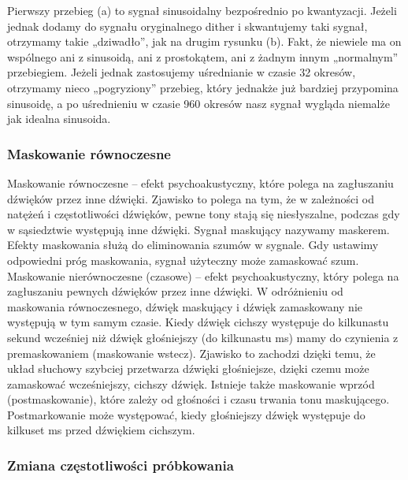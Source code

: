 \documentclass[a4paper,titleauthor]{mwart}
\begin{document}
Pierwszy przebieg (a) to sygnał sinusoidalny bezpośrednio po kwantyzacji. Jeżeli jednak dodamy do sygnału oryginalnego dither i skwantujemy taki sygnał, otrzymamy takie „dziwadło”, jak na drugim rysunku (b). \newline \newline
Fakt, że niewiele ma on wspólnego ani z sinusoidą, ani z prostokątem, ani z żadnym innym „normalnym” przebiegiem. Jeżeli jednak zastosujemy uśrednianie w czasie 32 okresów, otrzymamy nieco „pogryziony” przebieg, który jednakże już bardziej przypomina sinusoidę, a po uśrednieniu w czasie 960 okresów nasz sygnał wygląda niemalże jak idealna sinusoida.   


\subsubsection{Maskowanie równoczesne}

Maskowanie równoczesne – efekt psychoakustyczny, które polega na zagłuszaniu dźwięków przez inne dźwięki. Zjawisko to polega na tym, że w zależności od natężeń i częstotliwości dźwięków, pewne tony stają się niesłyszalne, podczas gdy w sąsiedztwie występują inne dźwięki. Sygnał maskujący nazywamy maskerem. \newline \newline
 Efekty maskowania służą do eliminowania szumów w sygnale. Gdy ustawimy odpowiedni próg maskowania, sygnał użyteczny może zamaskować szum.
\newline \newline
Maskowanie nierównoczesne (czasowe) – efekt psychoakustyczny, który polega na zagłuszaniu pewnych dźwięków przez inne dźwięki. \newline \newline
W odróżnieniu od maskowania równoczesnego, dźwięk maskujący i dźwięk zamaskowany nie występują w tym samym czasie. Kiedy dźwięk cichszy występuje do kilkunastu sekund wcześniej niż dźwięk głośniejszy (do kilkunastu ms) mamy do czynienia z premaskowaniem (maskowanie wstecz). Zjawisko to zachodzi dzięki temu, że układ słuchowy szybciej przetwarza dźwięki głośniejsze, dzięki czemu może zamaskować wcześniejszy, cichszy dźwięk. Istnieje także maskowanie wprzód (postmaskowanie), które zależy od głośności i czasu trwania tonu maskującego. Postmarkowanie może występować, kiedy głośniejszy dźwięk występuje do kilkuset ms przed dźwiękiem cichszym.

\subsubsection{Zmiana częstotliwości próbkowania}
\end{document}
